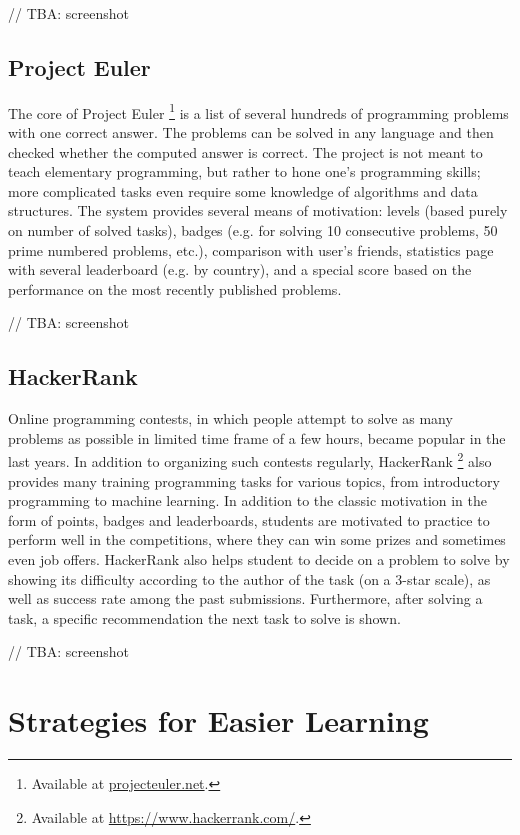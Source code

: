 // TBA: screenshot


\subsection{Project Euler}
\label{sec:project-euler}
The core of Project Euler%
\footnote{Available at \url{projecteuler.net}.}
is a list of several hundreds of programming problems with one correct answer.
The problems can be solved in any language
and then checked whether the computed answer is correct.
The project is not meant to teach elementary programming,
but rather to hone one’s programming skills;
more complicated tasks even require some knowledge of algorithms and data structures.
The system provides several means of motivation:
levels (based purely on number of solved tasks), badges
(e.g. for solving 10 consecutive problems, 50 prime numbered problems, etc.),
comparison with user’s friends,
statistics page with several leaderboard (e.g. by country),
and a special score based on the performance on the most recently published problems.

// TBA: screenshot


\subsection{HackerRank}
\label{sec:hacker-rank}

Online programming contests,
in which people attempt to solve as many problems as possible
in limited time frame of a few hours,
became popular in the last years.
In addition to organizing such contests regularly,
HackerRank%
\footnote{Available at \url{https://www.hackerrank.com/}.}
also provides many training programming tasks for various topics,
from introductory programming to machine learning.
In addition to the classic motivation in the form of points, badges and leaderboards, students are motivated to practice to perform well in the competitions,
where they can win some prizes and sometimes even job offers.
HackerRank also helps student to decide on a problem to solve by showing its difficulty according to the author of the task (on a 3-star scale),
as well as success rate among the past submissions.
Furthermore, after solving a task,
a specific recommendation the next task to solve is shown.

// TBA: screenshot


\section{Strategies for Easier Learning}
\label{sec:strategies-for-easier-learning}

